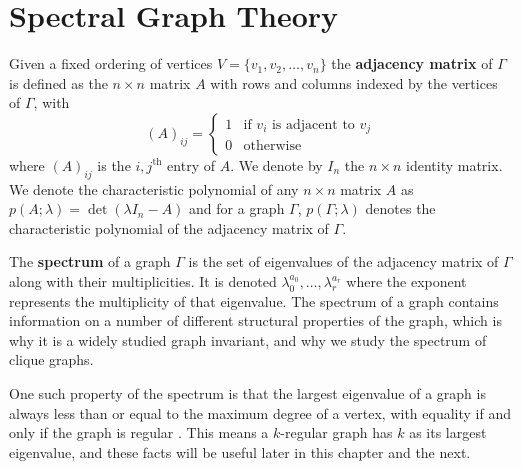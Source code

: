 \documentclass[12pt]{report}
\theoremstyle{definition}
\begin{document}
\chapter{Spectral Graph Theory}
Given a fixed ordering of vertices $V=\{v_1, v_2, \dots, v_n\}$ the \textbf{adjacency matrix} of $\Gamma$ is defined as the $n \times n$ matrix $A$ with rows and columns indexed by the vertices of $\Gamma$, with
\[(A)_{ij} = 
    \begin{cases}
        1 & \text{if $v_i$ is adjacent to $v_j$}\\
        0 & \text{otherwise}
    \end{cases}\]
where $(A)_{ij}$ is the $i, j^\text{th}$ entry of $A$. We denote by $I_n$ the $n\times n$ identity matrix. We denote the characteristic polynomial of any $n\times n$ matrix $A$ as $p(A;\lambda)=\det(\lambda I_n-A)$ and for a graph $\Gamma$, $p(\Gamma;\lambda)$ denotes the characteristic polynomial of the adjacency matrix of $\Gamma$. \par
The \textbf{spectrum} of a graph $\Gamma$ is the set of eigenvalues of the adjacency matrix of $\Gamma$ along with their multiplicities. It is denoted $\lambda_0^{a_0}, \ldots , \lambda_r^{a_r}$ where the exponent represents the multiplicity of that eigenvalue. The spectrum of a graph contains information on a number of different structural properties of the graph, which is why it is a widely studied graph invariant, and why we study the spectrum of clique graphs.\par
One such property of the spectrum is that the largest eigenvalue of a graph is always less than or equal to the maximum degree of a vertex, with equality if and only if the graph is regular \cite[Proposition 3.1.2]{haemers}. This means a $k$-regular graph has $k$ as its largest eigenvalue, and these facts will be useful later in this chapter and the next.
\end{document}
